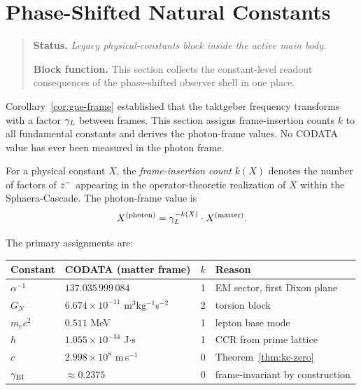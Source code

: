 \section{Phase-Shifted Natural Constants}
\begin{quote}\small
\noindent\textbf{Status.} \emph{Legacy physical-constants block inside the active main body.}\par
\noindent\textbf{Block function.} This section collects the constant-level readout consequences of the phase-shifted observer shell in one place.
\end{quote}
\label{sec:phase-constants}

\begin{remark}
Corollary~\ref{cor:gue-frame} established that the taktgeber frequency
transforms with a factor $\gamma_L$ between frames.
This section assigns frame-insertion counts $k$ to all fundamental
constants and derives the photon-frame values.
No CODATA value has ever been measured in the photon frame.
\end{remark}

\begin{definition}
For a physical constant $X$, the \emph{frame-insertion count} $k(X)$ denotes
 the number of factors of $z^-$ appearing in the operator-theoretic
 realization of $X$ within the Sphaera-Cascade.
The photon-frame value is
\[
  X^{(\mathrm{photon})} = \gamma_L^{-k(X)}\cdot X^{(\mathrm{matter})}.
\]
\end{definition}

\begin{theorem}\label{thm:k-values}
The primary assignments are:
\begin{center}
\renewcommand{\arraystretch}{1.3}
\begin{tabular}{llcl}
\toprule
Constant & CODATA (matter frame) & $k$ & Reason\\
\midrule
$\alpha^{-1}$ & $137.035\,999\,084$ & 1
  & EM sector, first Dixon plane\\
$G_N$ & $6.674\times10^{-11}$ m$^3$kg$^{-1}$s$^{-2}$ & 2
  & torsion block\\
$m_e c^2$ & $0.511$ MeV & 1
  & lepton base mode\\
$\hbar$ & $1.055\times10^{-34}$ J$\cdot$s & 1
  & CCR from prime lattice\\
$c$ & $2.998\times10^8$ m\,s$^{-1}$ & 0
  & Theorem~\ref{thm:kc-zero}\\
$\gamma_{\mathrm{BI}}$ & $\approx 0.2375$ & 0
  & frame-invariant by construction\\
\bottomrule
\end{tabular}
\end{center}
\end{theorem}

